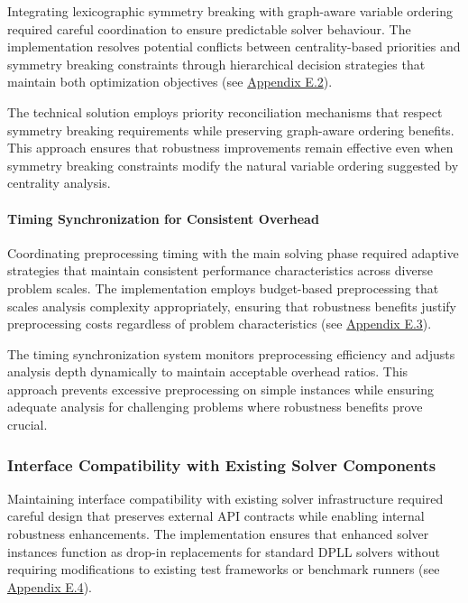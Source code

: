 Integrating lexicographic symmetry breaking with graph-aware variable ordering required careful coordination to ensure predictable solver behaviour. The implementation resolves potential conflicts between centrality-based priorities and symmetry breaking constraints through hierarchical decision strategies that maintain both optimization objectives (see \hyperref[appendix:symmetry-integration]{Appendix E.2}).

The technical solution employs priority reconciliation mechanisms that respect symmetry breaking requirements while preserving graph-aware ordering benefits. This approach ensures that robustness improvements remain effective even when symmetry breaking constraints modify the natural variable ordering suggested by centrality analysis.

\paragraph{Timing Synchronization for Consistent Overhead}

Coordinating preprocessing timing with the main solving phase required adaptive strategies that maintain consistent performance characteristics across diverse problem scales. The implementation employs budget-based preprocessing that scales analysis complexity appropriately, ensuring that robustness benefits justify preprocessing costs regardless of problem characteristics (see \hyperref[appendix:timing-coordination]{Appendix E.3}).

The timing synchronization system monitors preprocessing efficiency and adjusts analysis depth dynamically to maintain acceptable overhead ratios. This approach prevents excessive preprocessing on simple instances while ensuring adequate analysis for challenging problems where robustness benefits prove crucial.

\subsubsection{Interface Compatibility with Existing Solver Components}

Maintaining interface compatibility with existing solver infrastructure required careful design that preserves external API contracts while enabling internal robustness enhancements. The implementation ensures that enhanced solver instances function as drop-in replacements for standard DPLL solvers without requiring modifications to existing test frameworks or benchmark runners (see \hyperref[appendix:interface-compatibility]{Appendix E.4}).

